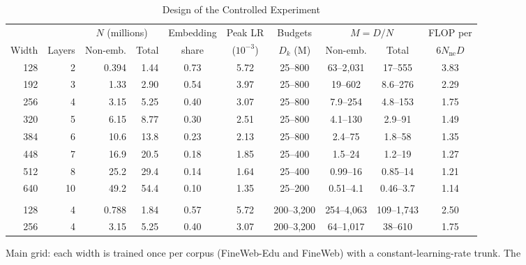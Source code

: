\begin{table}[tp]
\centering
\caption{Design of the Controlled Experiment}
\label{tab:app_sweepdesign}
\footnotesize
\setlength{\tabcolsep}{3pt}
\begin{tabular*}{\textwidth}{@{\extracolsep{\fill}}rrrrcccccc@{}}
\toprule
 & & \multicolumn{2}{c}{$N$ (millions)} & Embedding & Peak LR & Budgets & \multicolumn{2}{c}{$M=D/N$} & FLOP per \\
\cmidrule(lr){3-4}\cmidrule(lr){8-9}
Width & Layers & Non-emb. & Total & share & ($10^{-3}$) & $D_k$ (M) & Non-emb. & Total & $6N_{\mathrm{ne}}D$ \\
\midrule
128 & 2 & 0.394 & 1.44 & 0.73 & 5.72 & 25--800 & 63--2,031 & 17--555 & 3.83 \\
192 & 3 & 1.33 & 2.90 & 0.54 & 3.97 & 25--800 & 19--602 & 8.6--276 & 2.29 \\
256 & 4 & 3.15 & 5.25 & 0.40 & 3.07 & 25--800 & 7.9--254 & 4.8--153 & 1.75 \\
320 & 5 & 6.15 & 8.77 & 0.30 & 2.51 & 25--800 & 4.1--130 & 2.9--91 & 1.49 \\
384 & 6 & 10.6 & 13.8 & 0.23 & 2.13 & 25--800 & 2.4--75 & 1.8--58 & 1.35 \\
448 & 7 & 16.9 & 20.5 & 0.18 & 1.85 & 25--400 & 1.5--24 & 1.2--19 & 1.27 \\
512 & 8 & 25.2 & 29.4 & 0.14 & 1.64 & 25--400 & 0.99--16 & 0.85--14 & 1.21 \\
640 & 10 & 49.2 & 54.4 & 0.10 & 1.35 & 25--200 & 0.51--4.1 & 0.46--3.7 & 1.14 \\
\addlinespace
\multicolumn{10}{@{}l}{\textit{High-$M$ runs with a four-layer floor (extension data)}} \\
128 & 4 & 0.788 & 1.84 & 0.57 & 5.72 & 200--3,200 & 254--4,063 & 109--1,743 & 2.50 \\
256 & 4 & 3.15 & 5.25 & 0.40 & 3.07 & 200--3,200 & 64--1,017 & 38--610 & 1.75 \\
\bottomrule
\end{tabular*}
\vspace{3pt}
\begin{tablenotes}
Main grid: each width is trained once per corpus (FineWeb-Edu and FineWeb) with a constant-learning-rate trunk. The

\end{tablenotes}
\end{table}
